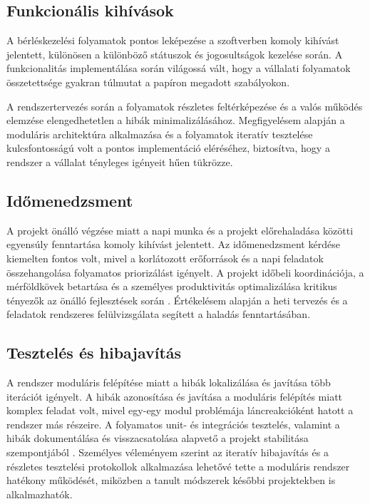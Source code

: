 \subsection{Funkcionális kihívások}

A bérléskezelési folyamatok pontos leképezése a szoftverben komoly kihívást jelentett, különösen a különböző státuszok és jogosultságok kezelése során.  
A funkcionalitás implementálása során világossá vált, hogy a vállalati folyamatok összetettsége gyakran túlmutat a papíron megadott szabályokon.  

A rendszertervezés során a folyamatok részletes feltérképezése és a valós működés elemzése elengedhetetlen a hibák minimalizálásához.  
Megfigyelésem alapján a moduláris architektúra alkalmazása és a folyamatok iteratív tesztelése kulcsfontosságú volt a pontos implementáció eléréséhez, biztosítva, hogy a rendszer a vállalat tényleges igényeit hűen tükrözze.

\subsection{Időmenedzsment}

A projekt önálló végzése miatt a napi munka és a projekt előrehaladása közötti egyensúly fenntartása komoly kihívást jelentett.
Az időmenedzsment kérdése kiemelten fontos volt, mivel a korlátozott erőforrások és a napi feladatok összehangolása 
folyamatos priorizálást igényelt. A projekt időbeli koordinációja, 
a mérföldkövek betartása és a személyes produktivitás optimalizálása kritikus tényezők az önálló fejlesztések során \cite{Kaposi2019,Kovacs2016}. 
Értékelésem alapján a heti tervezés és a feladatok rendszeres felülvizsgálata segített a haladás fenntartásában.

\subsection{Tesztelés és hibajavítás}

A rendszer moduláris felépítése miatt a hibák lokalizálása és javítása több iterációt igényelt.
A hibák azonosítása és javítása a moduláris felépítés miatt komplex feladat volt, mivel egy-egy modul problémája 
láncreakcióként hatott a rendszer más részeire. A folyamatos unit- és integrációs 
tesztelés, valamint a hibák dokumentálása és visszacsatolása alapvető a projekt stabilitása szempontjából \cite{Hajdu2014,Szalay2018}. 
Személyes véleményem szerint az iteratív hibajavítás és a részletes tesztelési protokollok alkalmazása lehetővé 
tette a moduláris rendszer hatékony működését, miközben a tanult módszerek későbbi projektekben is alkalmazhatók.

